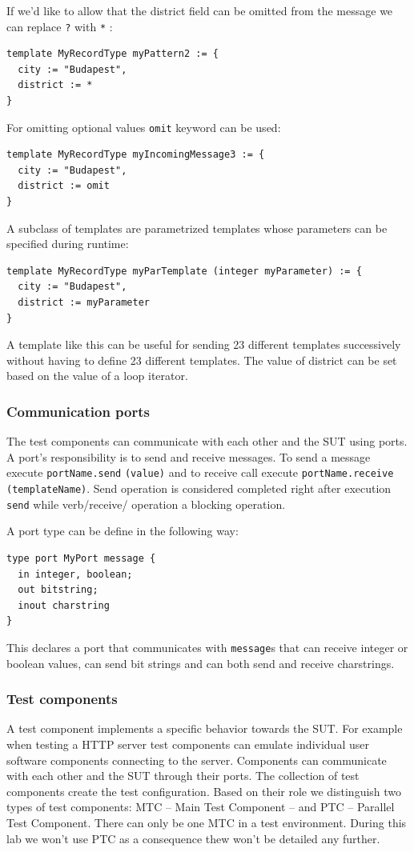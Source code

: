 \documentclass[a4paper]{article}
\begin{document}
If we'd like to allow that the district field can be omitted from the message we can replace \verb/?/ with \verb/*/ :
{\footnotesize
\begin{lstlisting}
template MyRecordType myPattern2 := {
  city := "Budapest",
  district := *
}
\end{lstlisting}
}

For omitting optional values \verb/omit/ keyword can be used:
{\footnotesize
\begin{lstlisting}
template MyRecordType myIncomingMessage3 := {
  city := "Budapest",
  district := omit
}
\end{lstlisting}
}

A subclass of templates are parametrized templates whose parameters can be specified during runtime:

{\footnotesize
\begin{lstlisting}
template MyRecordType myParTemplate (integer myParameter) := {
  city := "Budapest",
  district := myParameter
}
\end{lstlisting}
}

A template like this can be useful for sending 23 different templates successively without having to define 23 different templates. The value of district can be set based on the value of a loop iterator.

\subsubsection{Communication ports}

The test components can communicate with each other and the SUT using ports. A port's responsibility is to send and receive messages. To send a message execute \verb/portName.send/ \verb/(value)/ and to receive call execute \verb/portName.receive/ \verb/(templateName)/. Send operation is considered completed right after execution \verb/send/ while verb/receive/ operation a blocking operation.

A port type can be define in the following way:
{\footnotesize
\begin{lstlisting}
type port MyPort message {
  in integer, boolean;
  out bitstring;
  inout charstring
}
\end{lstlisting}
}

This declares a port that communicates with \verb/message/s that can receive integer or boolean values, can send bit strings and can both send and receive charstrings.

\subsubsection{Test components}
A test component implements a specific behavior towards the SUT. For example when testing a HTTP server test components can emulate individual user software components connecting to the server.
Components can communicate with each other and the SUT through their ports. The collection of test components create the test configuration. Based on their role we distinguish two types of test components: MTC -- Main Test Component -- and PTC -- Parallel Test Component. There can only be one MTC in a test environment. During this lab we won't use PTC as a consequence thew won't be detailed any further.
\end{document}
